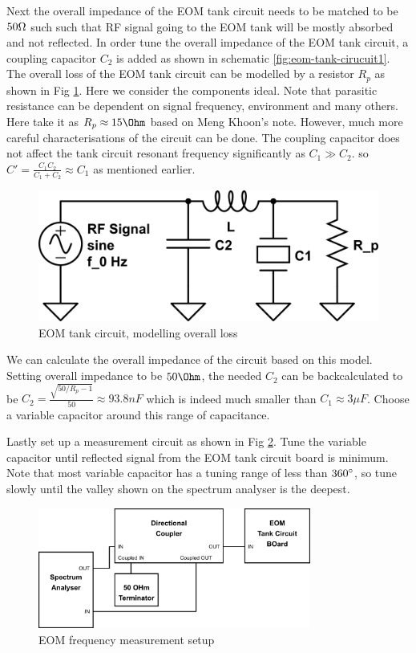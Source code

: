 \documentclass[12pt,A4Paper]{article}
\begin{document}
\par
Next the overall impedance of the EOM tank circuit needs to be matched to be $50\ohm$ such such that RF signal going to the EOM tank will be mostly absorbed and not reflected. In order tune the overall impedance of the EOM tank circuit, a coupling capacitor $C_2$ is added as shown in schematic \ref{fig:eom-tank-cirucuit1}. The overall loss of the EOM tank circuit can be modelled by a resistor $R_p$ as shown in Fig \ref{fig:eom-tank-cirucuit2}. Here we consider the components ideal. Note that parasitic resistance can be dependent on signal frequency, environment and many others. Here take it as $ R_p \approx 15 \Ohm$ based on Meng Khoon's note. However, much more careful characterisations of the circuit can be done. The coupling capacitor does not affect the tank circuit resonant frequency significantly as $C_1 \gg C_2$. so $C' = \frac{C_1C_2}{C_1+C_2} \approx C_1$ as mentioned earlier.  

\begin{figure}[H]
    \centering
    \includegraphics[width=.8\textwidth]{eom-tank-cirucuit2.png}
    \caption{EOM tank circuit, modelling overall loss}
    \label{fig:eom-tank-cirucuit2}
\end{figure}

We can calculate the overall impedance of the circuit based on this model. Setting overall impedance to be $50\Ohm$, the needed $C_2$ can be backcalculated to be $C_2 = \frac{\sqrt{50/R_p -1}}{50} \approx 93.8 nF$ which is indeed much smaller than $C_1 \approx 3 \mu F$. Choose a variable capacitor around this range of capacitance. 
\par
Lastly set up a measurement circuit as shown in Fig \ref{fig:eom-freq-measurement-setup.png}. Tune the variable capacitor until reflected signal from the EOM tank circuit board is minimum. Note that most variable capacitor has a tuning range of less than $360\degree$, so tune slowly until the valley shown on the spectrum analyser is the deepest. 

\begin{figure}[H]
    \centering
    \includegraphics[width=0.8\textwidth]{eom-freq-measurement-setup.png}
    \caption{EOM frequency measurement setup}
    \label{fig:eom-freq-measurement-setup.png}
\end{figure}
\end{document}
